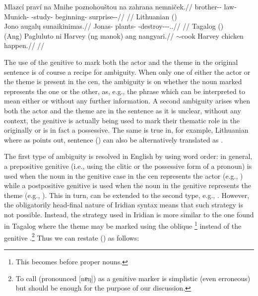 \pex
\a\begingl
    \gla Mlazcí praví na Mnihe poznohouštou na zahrana nemniček.//
    \glb brother-\Dim{}-\Gen{} law-\Gen{} \Loc{} Munich-\Acc{} \Ger{}-study-\Nz{} \Loc{} beginning-\Acc{} surprise-\Av{}-\Pf{}//
    \glft {}//
\endgl
\a Lithuanian (\cite[1]{serekaite2020})\\
\begingl
    \gla Jono augalų sunaikinimas.//
    \glb Jonas-\Gen{} plants-\Gen{} \Pfv{}-destroy-\Caus{}-\Nz-\Nom{}.\M{}.\Sg{}//
    \glft {}//
\endgl
\a Tagalog (\cite[22]{hsieh2019})\\
\begingl
    \gla (Ang) Pagluluto ni Harvey (ng manok) ang nangyari.//
    \glb \Nom{} \Ger{}$\sim$cook \Gen{} Harvey \Gen{} chicken \Nom{} happen.\Pfv{}//
    \glft {}//
\endgl
\xe

The use of the genitive to mark both the actor and the theme in
the original sentence is of course a recipe for ambiguity. When only one of
either the actor or the theme is present in the {\sc cen}, the ambiguity is on
whether the noun marked represents the one or the other, as, e.g., the phrase
 which can be interpreted to mean either  or  without any further
information. A second ambiguity arises when both the actor and the theme are in
the sentence as it is unclear, without any context, the genitive is actually
being used to mark their thematic role in the originally or is in fact a
possessive. The same is true in, for example, Lithuanian where
as \textcite{serekaite2020} points out, sentence
() can also be alternatively translated as
.

The first type of ambiguity is resolved in English by using word
order: in general, a prepositive genitive (i.e., using the clitic 
or the possessive form of a pronoun) is used when the noun in the genitive case
in the {\sc cen} represents the actor (e.g., ) while a
postpositive genitive is used when the noun in the genitive represents the theme
(e.g., ). This in turn, can be extended to the
second type, e.g., . However, the
obligatorily head-final nature of Iridian syntax means that such strategy is not
possible. Instead, the strategy used in Iridian is more similar to the one found
in Tagalog where the theme may be marked using the oblique
\footnote{This becomes  before proper nouns.} instead
of the genitive .\footnote{ To call  (pronounced [nɐŋ])
as a genitive marker is simplistic (even erroneous) but should be enough for the
purpose of our discussion. } Thus we can restate ()
as follows:

